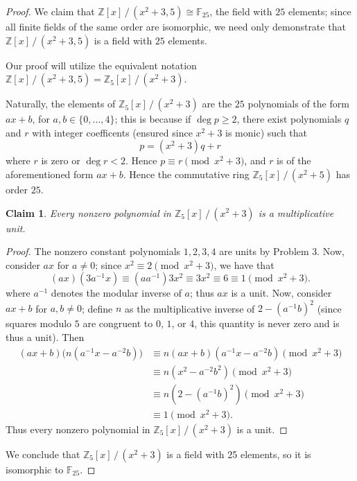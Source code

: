 \documentclass[11pt]{article}
\newtheorem{claim}{Claim}
\begin{document}
\begin{proof}
We claim that $\boxed{\mathbb{Z}[x] \,/\, (x^{2} + 3, 5) \cong \mathbb{F}_{25}}$, the field with $25$ elements; since all finite fields of the same order are isomorphic, we need only demonstrate that $\mathbb{Z}[x] \,/\, (x^{2} + 3, 5)$ is a field with $25$ elements. 

Our proof will utilize the equivalent notation $\mathbb{Z}[x] \,/\, (x^{2} + 3, 5) = \mathbb{Z}_{5}[x] \,/\, (x^{2} + 3)$.

\newpage

Naturally, the elements of $\mathbb{Z}_{5}[x] \,/\, (x^{2} + 3)$ are the $25$ polynomials of the form $ax + b$, for $a,b \in \{ 0, \ldots, 4 \}$; this is because if $\deg p \ge 2$, there exist polynomials $q$ and $r$ with integer coefficents (ensured since $x^{2} + 3$ is monic) such that
\[
  p = (x^{2} + 3)q + r
\]
where $r$ is zero or $\deg r < 2$. Hence $p \equiv r \pmod{x^{2} + 3}$, and $r$ is of the aforementioned form $ax + b$. Hence the commutative ring $\mathbb{Z}_{5}[x] \,/\, (x^{2} + 5)$ has order $25$.

\begin{adjustwidth}{1cm}{}
  \begin{claim}
    Every nonzero polynomial in $\mathbb{Z}_{5}[x] \,/\, (x^{2} + 3)$ is a multiplicative unit.
  \end{claim}
  \begin{proof}\renewcommand{\qedsymbol}{}
    The nonzero constant polynomials $1, 2, 3, 4$ are units by Problem 3. Now, consider $ax$ for $a \ne 0$; since $x^{2} \equiv 2 \pmod{x^{2} + 3}$, we have that
    \[
      (ax)(3a^{-1}x) \equiv (a a^{-1})3x^{2} \equiv 3x^{2} \equiv 6 \equiv 1 \pmod{x^{2} + 3}.
    \]
    where $a^{-1}$ denotes the modular inverse of $a$; thus $ax$ is a unit. Now, consider $ax + b$ for $a, b \ne 0$; define $n$ as the multiplicative inverse of $2 - (a^{-1}b)^{2}$ (since squares modulo $5$ are congruent to $0$, $1$, or $4$, this quantity is never zero and is thus a unit). Then
    \begin{align*}
      (ax + b) \Big( n(a^{-1}x - a^{-2}b) \Big) &\equiv n(ax + b)(a^{-1}x - a^{-2}b) \pmod{x^{2} + 3} \\
      &\equiv n(x^{2} - a^{-2}b^{2}) \pmod{x^{2} + 3} \\
      &\equiv n(2 - (a^{-1}b)^{2}) \pmod{x^{2} + 3} \\
      &\equiv 1 \pmod{x^{2} + 3}.
    \end{align*}
    Thus every nonzero polynomial in $\mathbb{Z}_{5}[x] \,/\, (x^{2} + 3)$ is a unit.
  \end{proof}
\end{adjustwidth}

We conclude that $\mathbb{Z}_{5}[x] \,/\, (x^{2} + 3)$ is a field with 25 elements, so it is isomorphic to $\mathbb{F}_{25}$.
\end{proof}
\end{document}
